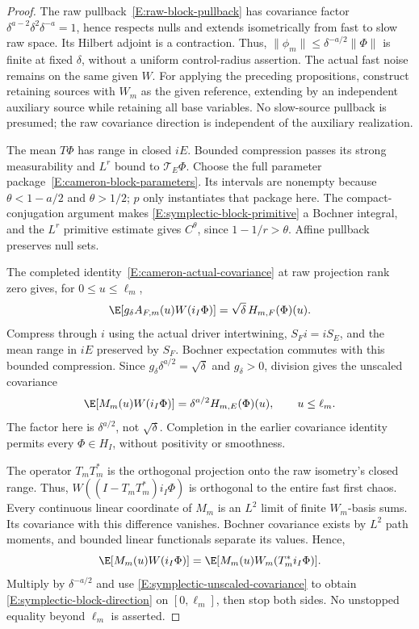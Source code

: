 \begin{proof}
  The raw pullback~\eqref{E:raw-block-pullback} has covariance
  factor $\delta^{a-2}\delta^2\delta^{-a}=1$, hence respects
  nulls and extends isometrically from fast to slow raw space.
  Its Hilbert adjoint is a contraction.
  Thus, $\|\phi_m\|\le\delta^{-a/2}\|\Phi\|$ is finite
  at fixed $\delta$, without a uniform control-radius assertion.
  The actual fast noise remains on the same given $W$.
  For applying the preceding propositions, construct retaining
  sources with $W_m$ as the given reference, extending by an
  independent auxiliary source while retaining all base variables.
  No slow-source pullback is presumed; the raw covariance direction
  is independent of the auxiliary realization.

  The mean $T\Phi$ has range in closed $iE$.
  Bounded compression passes its strong measurability and $L^r$
  bound to $\mathcal T_E\Phi$.
  Choose the full parameter package~\eqref{E:cameron-block-parameters}.
  Its intervals are nonempty because $\theta<1-a/2$ and
  $\theta>1/2$; $p$ only instantiates that package here.
  The compact-conjugation argument makes
  \eqref{E:symplectic-block-primitive} a Bochner integral, and
  the $L^r$ primitive estimate gives $C^\theta$, since
  $1-1/r>\theta$. Affine pullback preserves null sets.

  The completed identity~\eqref{E:cameron-actual-covariance}
  at raw projection rank zero gives, for $0\le u\le\ell_m$,
  \[
    \E[g_\delta A_{F,m}(u)W(i_I\Phi)]
    =\sqrt\delta\,H_{m,F}(\Phi)(u).
  \]
  Compress through $i$ using the actual driver intertwining,
  $S_Fi=iS_E$, and the mean range in $iE$ preserved by $S_F$.
  Bochner expectation commutes with this bounded compression.
  Since $g_\delta\delta^{a/2}=\sqrt\delta$ and $g_\delta>0$,
  division gives the unscaled covariance
  \begin{equation}\label{E:symplectic-unscaled-covariance}
    \E[M_m(u)W(i_I\Phi)]
    =\delta^{a/2}H_{m,E}(\Phi)(u),\qquad u\le\ell_m .
  \end{equation}
  The factor here is $\delta^{a/2}$, not $\sqrt\delta$.
  Completion in the earlier covariance identity permits every
  $\Phi\in H_I$, without positivity or smoothness.

  The operator $T_mT_m^*$ is the orthogonal projection onto
  the raw isometry's closed range. Thus,
  $W((I-T_mT_m^*)i_I\Phi)$ is orthogonal to the entire fast
  first chaos. Every continuous linear coordinate of $M_m$
  is an $L^2$ limit of finite $W_m$-basis sums.
  Its covariance with this difference vanishes.
  Bochner covariance exists by $L^2$ path moments, and bounded
  linear functionals separate its values. Hence,
  \[
    \E[M_m(u)W(i_I\Phi)]
    =\E[M_m(u)W_m(T_m^*i_I\Phi)] .
  \]
  Multiply by $\delta^{-a/2}$ and use
  \eqref{E:symplectic-unscaled-covariance} to obtain
  \eqref{E:symplectic-block-direction} on $[0,\ell_m]$,
  then stop both sides. No unstopped equality beyond $\ell_m$
  is asserted.


\end{proof}
